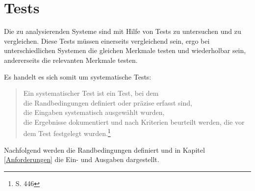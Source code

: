 \section{Tests}

Die zu analysierenden Systeme sind mit Hilfe von Tests zu untersuchen und zu vergleichen.
Diese Tests müssen einerseits vergleichend sein, ergo bei unterschiedlichen Systemen die gleichen Merkmale testen und wiederholbar sein, andererseits die relevanten Merkmale testen.

Es handelt es sich somit um systematische Tests:
\begin {quote}
Ein systematischer Test ist ein Test, bei dem\\
die Randbedingungen definiert oder präzise erfasst sind,\\
die Eingaben systematisch ausgewählt wurden,\\
die Ergebnisse dokumentiert und nach Kriterien beurteilt werden, die vor dem Test festgelegt wurden.\footnote{\cite{book:softwareengineering} S. 446}
\end{quote}

Nachfolgend werden die Randbedingungen definiert und in Kapitel \ref{Anforderungen} die Ein- und Ausgaben dargestellt.


